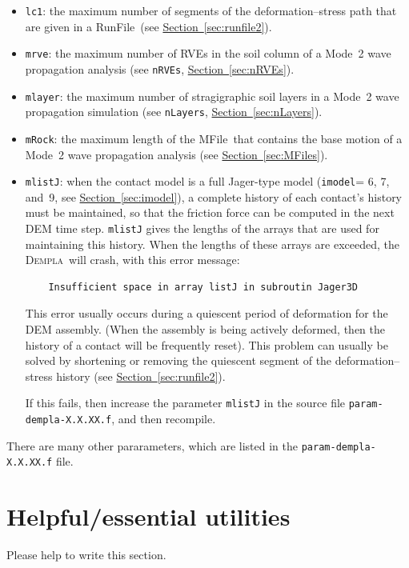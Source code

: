 \documentclass[letterpaper,11pt]{article}
\newcommand{\Dempla}{\textsc{Dempla}}
\newcommand{\RunFile}{\textsf{RunFile}}
\newcommand{\MFile}{\textsf{MFile}}
\begin{document}
\begin{itemize}
\item
\texttt{lc1}:  the maximum number of segments of the
deformation--stress path that are given in a \RunFile\ (see
\hyperref[sec:runfile2]{Section~\ref*{sec:runfile2}}).
\item
\texttt{mrve}: the maximum number of RVEs in the soil
column of a Mode~2 wave propagation analysis
(see \texttt{nRVEs},
\hyperref[sec:nRVEs]{Section~\ref*{sec:nRVEs}}).
\item
\texttt{mlayer}: the maximum number of stragigraphic
soil layers in a Mode~2 wave propagation simulation
(see \texttt{nLayers},
\hyperref[sec:nLayers]{Section~\ref*{sec:nLayers}}).
\item
\texttt{mRock}: the maximum length of the \MFile\ 
that contains the base motion of a Mode~2 wave propagation
analysis
(see \hyperref[sec:MFiles]{Section~\ref*{sec:MFiles}}).
\item
\texttt{mlistJ}: when the contact model is a full
Jager-type model
(\texttt{imodel}= 6, 7, and~9,
see \hyperref[sec:imodel]{Section~\ref*{sec:imodel}}),
a complete history of each contact's history must
be maintained, so that the friction force can be
computed in the next DEM time step.
\texttt{mlistJ} gives the lengths of the arrays
that are used for maintaining this history.
When the lengths of these arrays are exceeded,
the \Dempla\ will crash, with this error message:
\begin{verbatim}
	Insufficient space in array listJ in subroutin Jager3D
\end{verbatim}
This error usually occurs during a quiescent period
of deformation for the DEM assembly.
(When the assembly is being actively deformed,
then the history of a contact will be frequently reset).
This problem can usually be solved by shortening or removing the
quiescent segment of the deformation--stress history
(see \hyperref[sec:runfile2]{Section~\ref*{sec:runfile2}}).
\par
If this fails, then increase the parameter \texttt{mlistJ}
in the source file \texttt{param-dempla-X.X.XX.f},
and then recompile.
\end{itemize}
%
There are many other pararameters, which are listed
in the \texttt{param-dempla-X.X.XX.f} file.
%
%
\section{Helpful/essential utilities}\label{sec:Utilities}
Please help to write this section.
%
%
%
%
\end{document}
